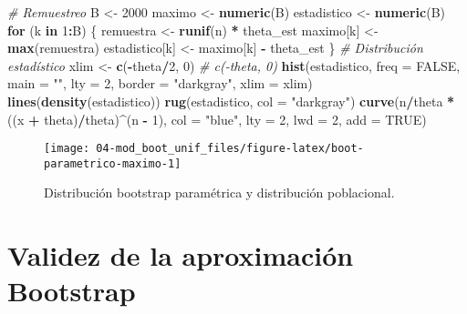 \documentclass[
]{book}
\newenvironment{Shaded}{\begin{snugshade}}{\end{snugshade}}
\newcommand{\CommentTok}[1]{\textcolor[rgb]{0.56,0.35,0.01}{\textit{#1}}}
\newcommand{\ControlFlowTok}[1]{\textcolor[rgb]{0.13,0.29,0.53}{\textbf{#1}}}
\newcommand{\DataTypeTok}[1]{\textcolor[rgb]{0.13,0.29,0.53}{#1}}
\newcommand{\DecValTok}[1]{\textcolor[rgb]{0.00,0.00,0.81}{#1}}
\newcommand{\KeywordTok}[1]{\textcolor[rgb]{0.13,0.29,0.53}{\textbf{#1}}}
\newcommand{\NormalTok}[1]{#1}
\newcommand{\OperatorTok}[1]{\textcolor[rgb]{0.81,0.36,0.00}{\textbf{#1}}}
\newcommand{\OtherTok}[1]{\textcolor[rgb]{0.56,0.35,0.01}{#1}}
\newcommand{\StringTok}[1]{\textcolor[rgb]{0.31,0.60,0.02}{#1}}
\theoremstyle{definition}
\theoremstyle{definition}
\theoremstyle{definition}
\theoremstyle{remark}
\begin{document}
\begin{Shaded}
\begin{Highlighting}[]
\CommentTok{# Remuestreo}
\NormalTok{B <-}\StringTok{ }\DecValTok{2000}
\NormalTok{maximo <-}\StringTok{ }\KeywordTok{numeric}\NormalTok{(B)}
\NormalTok{estadistico <-}\StringTok{ }\KeywordTok{numeric}\NormalTok{(B)}
\ControlFlowTok{for}\NormalTok{ (k }\ControlFlowTok{in} \DecValTok{1}\OperatorTok{:}\NormalTok{B) \{}
\NormalTok{    remuestra <-}\StringTok{ }\KeywordTok{runif}\NormalTok{(n) }\OperatorTok{*}\StringTok{ }\NormalTok{theta_est}
\NormalTok{    maximo[k] <-}\StringTok{ }\KeywordTok{max}\NormalTok{(remuestra)}
\NormalTok{    estadistico[k] <-}\StringTok{ }\NormalTok{maximo[k] }\OperatorTok{-}\StringTok{ }\NormalTok{theta_est}
\NormalTok{\}}
\CommentTok{# Distribución estadístico}
\NormalTok{xlim <-}\StringTok{ }\KeywordTok{c}\NormalTok{(}\OperatorTok{-}\NormalTok{theta}\OperatorTok{/}\DecValTok{2}\NormalTok{, }\DecValTok{0}\NormalTok{) }\CommentTok{# c(-theta, 0)}
\KeywordTok{hist}\NormalTok{(estadistico, }\DataTypeTok{freq =} \OtherTok{FALSE}\NormalTok{, }\DataTypeTok{main =} \StringTok{""}\NormalTok{, }\DataTypeTok{lty =} \DecValTok{2}\NormalTok{, }
     \DataTypeTok{border =} \StringTok{"darkgray"}\NormalTok{, }\DataTypeTok{xlim =}\NormalTok{ xlim)}
\KeywordTok{lines}\NormalTok{(}\KeywordTok{density}\NormalTok{(estadistico))}
\KeywordTok{rug}\NormalTok{(estadistico, }\DataTypeTok{col =} \StringTok{"darkgray"}\NormalTok{)}
\KeywordTok{curve}\NormalTok{(n}\OperatorTok{/}\NormalTok{theta }\OperatorTok{*}\StringTok{ }\NormalTok{((x }\OperatorTok{+}\StringTok{ }\NormalTok{theta)}\OperatorTok{/}\NormalTok{theta)}\OperatorTok{^}\NormalTok{(n }\OperatorTok{-}\StringTok{ }\DecValTok{1}\NormalTok{), }\DataTypeTok{col =} \StringTok{"blue"}\NormalTok{, }\DataTypeTok{lty =} \DecValTok{2}\NormalTok{, }\DataTypeTok{lwd =} \DecValTok{2}\NormalTok{, }\DataTypeTok{add =} \OtherTok{TRUE}\NormalTok{)}
\end{Highlighting}
\end{Shaded}

\begin{figure}[!htb]

{\centering \texttt{[image: 04-mod\_boot\_unif\_files/figure-latex/boot-parametrico-maximo-1]} 

}

\caption{Distribución bootstrap paramétrica y distribución poblacional.}\label{fig:boot-parametrico-maximo}
\end{figure}

\hypertarget{validez-de-la-aproximaciuxf3n-bootstrap}{%
\section{Validez de la aproximación Bootstrap}\label{validez-de-la-aproximaciuxf3n-bootstrap}}
\end{document}
